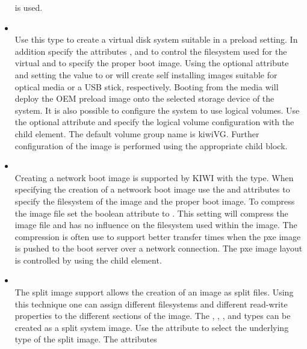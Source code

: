 \begin{itemize}
      is used.
\item {}\\
      Use this type to create a virtual disk system suitable in a preload
      setting. In addition specify the attributes , 
      and  to control the filesystem used
      for the virtual and to specify the proper boot image. Using the optional
       attribute and setting the value to  or 
       will create self installing images suitable for optical media
      or a USB stick, respectively. Booting from the media will deploy
      the OEM preload image onto the selected storage device of the
      system. It is also possible to configure the system to use logical
      volumes. Use the optional  attribute and specify the
      logical volume configuration with the  child
      element. The default volume group name is kiwiVG. Further configuration
      of the image is performed using the appropriate  child
      block.
\item {}\\
      Creating a network boot image is supported by KIWI with the 
       type. When specifying the creation of a netwoork boot image use the
       and  attributes 
      to specify the filesystem of the image and the proper boot image. To
      compress the image file set the  boolean attribute
      to . This setting will compress the image file and has no influence
      on the filesystem used within the image. The compression is often use to
      support better transfer times when the pxe image is pushed to the 
      boot server over a network connection. The pxe image layout is
      controlled by using the  child element.
\item {}\\
      The split image support allows the creation of an image as split
      files. Using this technique one can assign different filesystems and
      different read-write properties to the different sections of the image.
      The , , , and  
      types can be created as a split system image. Use the 
       attribute
      to select the underlying type of the split image. The attributes

\end{itemize}

